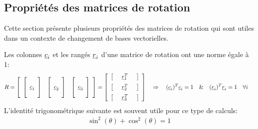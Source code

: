 \subsection{Propriétés des matrices de rotation}

Cette section présente plusieurs propriétés des matrices de rotation qui sont utiles dans un contexte de changement de bases vectorielles.

\begin{property}

Les colonnes $\underline{c}_i$ et les rangés $\underline{r}_i$ d'une matrice de rotation ont une norme égale à 1:
\begin{align}
R &= 
\left[ \begin{array}{c c c} 
	\left[ \begin{array}{c} \\ \underline{c}_1 \\  \\ \end{array}  \right] & \left[ \begin{array}{c} \\ \underline{c}_2 \\  \\ \end{array}  \right] & \left[ \begin{array}{c} \\ \underline{c}_3 \\  \\ \end{array}  \right]
\end{array} \right]
=
\left[ \begin{array}{c} 
\left[ \begin{array}{c c c} & \underline{r}_1^T & \end{array} \right] \\[\medskipamount]
\left[ \begin{array}{c c c} & \underline{r}_2^T & \end{array} \right] \\[\medskipamount]
\left[ \begin{array}{c c c} & \underline{r}_3^T & \end{array} \right] 
\end{array} \right] 
\quad \Rightarrow \quad
(\underline{c}_i)^T \underline{c}_i = 1 \quad \& \quad (\underline{r}_i)^T \underline{r}_i = 1  \quad \forall i 
\end{align}
L’identité trigonométrique suivante est souvent utile pour ce type de calculs:
\begin{align}
\sin^2(\theta) + \cos^2(\theta) = 1
\end{align}
\end{property}


